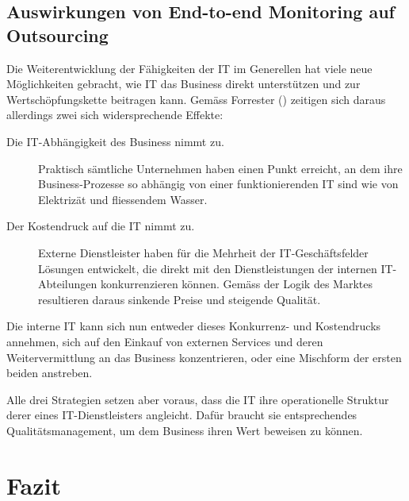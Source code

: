 \documentclass[11pt,listof=totoc]{scrreprt} %
\theoremstyle{definition}
\begin{document}
\section{Auswirkungen von End-to-end Monitoring auf Outsourcing}

Die Weiterentwicklung der Fähigkeiten der IT im Generellen hat viele neue Möglichkeiten gebracht, wie IT das Business direkt unterstützen und zur Wertschöpfungskette beitragen kann. Gemäss Forrester (\cite{forrester:slaBestPractices}) zeitigen sich daraus allerdings zwei sich widersprechende Effekte:

\begin{description}
\item[Die IT-Abhängigkeit des Business nimmt zu.] Praktisch sämtliche Unternehmen haben einen Punkt erreicht, an dem ihre Business-Prozesse so abhängig von einer funktionierenden IT sind wie von Elektrizät und fliessendem Wasser.
\item[Der Kostendruck auf die IT nimmt zu.] Externe Dienstleister haben für die Mehrheit der IT-Geschäftsfelder Lösungen entwickelt, die direkt mit den Dienstleistungen der internen IT-Abteilungen konkurrenzieren können. Gemäss der Logik des Marktes resultieren daraus sinkende Preise und steigende Qualität.
\end{description}

Die interne IT kann sich nun entweder dieses Konkurrenz- und Kostendrucks annehmen, sich auf den Einkauf von externen Services und deren Weitervermittlung an das Business konzentrieren, oder eine Mischform der ersten beiden anstreben.

Alle drei Strategien setzen aber voraus, dass die IT ihre operationelle Struktur derer eines IT-Dienstleisters angleicht. Dafür braucht sie entsprechendes Qualitätsmanagement, um dem Business ihren Wert beweisen zu können.

\chapter{Fazit}
\label{fazit}

\listoffigures



\end{document}
